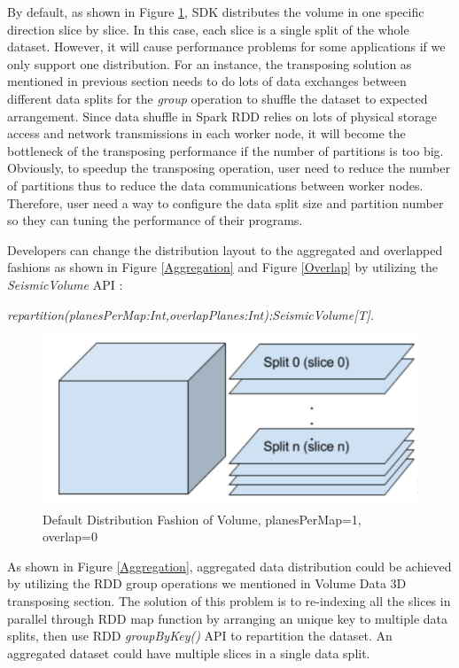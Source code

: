 By default, as shown in Figure \ref{DefDist}, SDK distributes the volume in one specific direction slice by slice. In this case, each slice is a single split of the whole dataset. However, it will cause performance problems for some applications if we only support one distribution. For an instance, the transposing solution as mentioned in previous section needs to do lots of data exchanges between different data splits for the \emph{group} operation to shuffle the dataset to expected arrangement. Since data shuffle in Spark RDD relies on lots of physical storage access and network transmissions in each worker node, it will become the bottleneck of the transposing performance if the number of partitions is too big. Obviously, to speedup the transposing operation, user need to reduce the number of partitions thus to reduce the data communications between worker nodes. Therefore, user need a way to configure the data split size and partition number so they can tuning the performance of their programs.

Developers can change the distribution layout to the aggregated and overlapped fashions as shown in Figure \ref{Aggregation} and Figure \ref{Overlap} by utilizing the \emph{SeismicVolume} API :

 \emph{repartition(planesPerMap:Int,overlapPlanes:Int):SeismicVolume[T]}.

\begin{figure}[h]
\centering
\includegraphics[scale=0.6]{figures/DefDist.png}
\caption{Default Distribution Fashion of Volume, planesPerMap=1, overlap=0}
\label{DefDist}
\end{figure}

As shown in Figure \ref{Aggregation}, aggregated data distribution could be achieved by utilizing the RDD group operations we mentioned in Volume Data 3D transposing section. The solution of this problem is to re-indexing all the slices in parallel through RDD map function by arranging an unique key to multiple data splits, then use RDD \emph{groupByKey()} API to repartition the dataset. An aggregated dataset could have multiple slices in a single data split.

